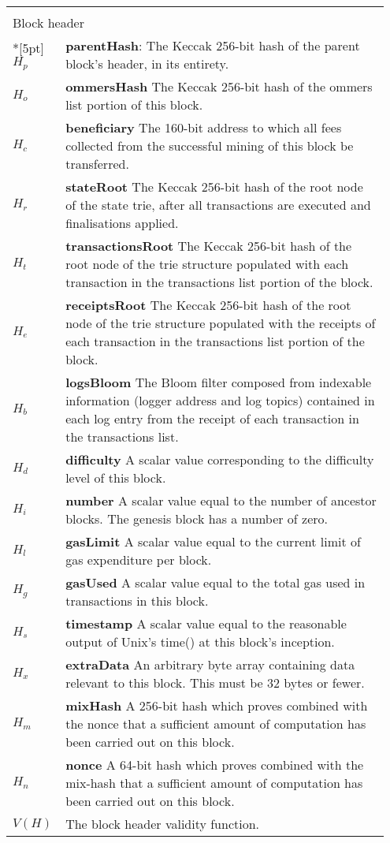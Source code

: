 \documentclass[9pt,oneside]{amsart}
\begin{document}
\begin{longtable}{p{0.10\linewidth}p{0.85\linewidth}}
\vspace{5pt} \\
\multicolumn{2}{l}{Block header} \\*[5pt]
$H_p$ & \textbf{parentHash}: The Keccak 256-bit hash of the parent block's
header, in its entirety. \\
$H_o$ & \textbf{ommersHash} The Keccak 256-bit hash of the ommers list portion
of this block. \\
$H_c$ & \textbf{beneficiary} The 160-bit address to which all fees collected
from the successful mining of this block be transferred. \\
$H_r$ & \textbf{stateRoot} The Keccak 256-bit hash of the root node of the
state trie, after all transactions are executed and finalisations applied. \\
$H_t$ & \textbf{transactionsRoot} The Keccak 256-bit hash of the root node of
the trie structure populated with each transaction in the transactions list
portion of the block. \\
$H_e$ & \textbf{receiptsRoot} The Keccak 256-bit hash of the root node of the
trie structure populated with the receipts of each transaction in the
transactions list portion of the block. \\
$H_b$ & \textbf{logsBloom} The Bloom filter composed from indexable information
(logger address and log topics) contained in each log entry from the receipt of
each transaction in the transactions list. \\
$H_d$ & \textbf{difficulty} A scalar value corresponding to the difficulty
level of this block. \\
$H_i$ & \textbf{number} A scalar value equal to the number of ancestor
blocks. The genesis block has a number of zero. \\
$H_l$ & \textbf{gasLimit} A scalar value equal to the current limit of gas
expenditure per block. \\
$H_g$ & \textbf{gasUsed} A scalar value equal to the total gas used in
transactions in this block. \\
$H_s$ & \textbf{timestamp} A scalar value equal to the reasonable output of
Unix's time() at this block's inception. \\
$H_x$ & \textbf{extraData} An arbitrary byte array containing data relevant to
this block. This must be 32 bytes or fewer. \\
$H_m$ & \textbf{mixHash} A 256-bit hash which proves combined with the nonce
that a sufficient amount of computation has been carried out on this block. \\
$H_n$ & \textbf{nonce} A 64-bit hash which proves combined with the mix-hash
that a sufficient amount of computation has been carried out on this block. \\
$V(H)$ & The block header validity function. \\


\end{longtable}
\end{document}

